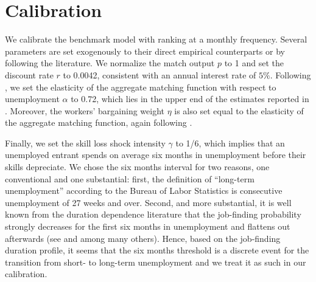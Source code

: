 \documentclass[12pt]{article} %
\theoremstyle{definition}
\begin{document}
\fi




\section{Calibration}\label{section calibration} 
We calibrate the benchmark model with ranking at a monthly frequency.
Several parameters are set exogenously to their direct empirical counterparts or by following the literature.
We normalize the match output $p$ to 1 and set the discount rate $r$ to 0.0042, consistent with an annual interest rate of $5\%$.
Following \cite{shimer2005cyclical}, we set the elasticity of the aggregate matching function with respect to unemployment $\alpha$ to 0.72, which lies in the upper end of the estimates reported in \cite{petrongolo2001looking}.
Moreover, the workers' bargaining weight $\eta$ is also set equal to the elasticity of the aggregate matching function, again following \cite{shimer2005cyclical}.

Finally, we set the skill loss shock intensity $\gamma$ to 1/6, which implies that an unemployed entrant spends on average six months in unemployment before their skills depreciate.
We chose the six months interval for two reasons, one conventional and one substantial: first, the definition of ``long-term unemployment'' according to the Bureau of Labor Statistics is consecutive unemployment of 27 weeks and over.
Second, and more substantial, it is well known from the duration dependence literature that the job-finding probability strongly decreases for the first six months in unemployment and flattens out afterwards (see \citealt{jarosch2019statistical} and \citealt{kospentaris2021unobserved} among many others).
Hence, based on the job-finding duration profile, it seems that the six months threshold is a discrete event for the transition from short- to long-term unemployment and we treat it as such in our calibration.
\end{document}
